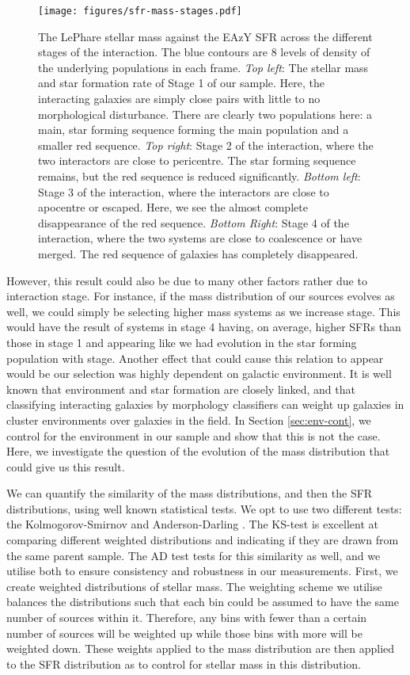 \documentclass[fleqn,usenatbib]{mnras}
\begin{document}
\begin{figure}
    \centering
    \texttt{[image: figures/sfr-mass-stages.pdf]}
    \caption{The LePhare stellar mass against the EAzY SFR across the different stages of the interaction. The blue contours are 8 levels of density of the underlying populations in each frame. \textit{Top left}: The stellar mass and star formation rate of Stage 1 of our sample. Here, the interacting galaxies are simply close pairs with little to no morphological disturbance. There are clearly two populations here: a main, star forming sequence forming the main population and a smaller red sequence. \textit{Top right}: Stage 2 of the interaction, where the two interactors are close to pericentre. The star forming sequence remains, but the red sequence is reduced significantly. \textit{Bottom left}: Stage 3 of the interaction, where the interactors are close to apocentre or escaped. Here, we see the almost complete disappearance of the red sequence. \textit{Bottom Right}: Stage 4 of the interaction, where the two systems are close to coalescence or have merged. The red sequence of galaxies has completely disappeared.}
    \label{fig:sfr-mass}
\end{figure}

However, this result could also be due to many other factors rather due to interaction stage. For instance, if the mass distribution of our sources evolves as well, we could simply be selecting higher mass systems as we increase stage. This would have the result of systems in stage 4 having, on average, higher SFRs than those in stage 1 and appearing like we had evolution in the star forming population with stage. Another effect that could cause this relation to appear would be our selection was highly dependent on galactic environment. It is well known that environment and star formation are closely linked, and that classifying interacting galaxies by morphology classifiers can weight up galaxies in cluster environments over galaxies in the field. In Section \ref{sec:env-cont}, we control for the environment in our sample and show that this is not the case. Here, we investigate the question of the evolution of the mass distribution that could give us this result.

We can quantify the similarity of the mass distributions, and then the SFR distributions, using well known statistical tests. We opt to use two different tests: the Kolmogorov-Smirnov \citep[KS-test;][]{an1933sulla} and Anderson-Darling \citep[AD-test;][]{stephens_74}. The KS-test is excellent at comparing different weighted distributions and indicating if they are drawn from the same parent sample. The AD test tests for this similarity as well, and we utilise both to ensure consistency and robustness in our measurements. First, we create weighted distributions of stellar mass. The weighting scheme we utilise balances the distributions such that each bin could be assumed to have the same number of sources within it. Therefore, any bins with fewer than a certain number of sources will be weighted up while those bins with more will be weighted down. These weights applied to the mass distribution are then applied to the SFR distribution as to control for stellar mass in this distribution.
\end{document}
